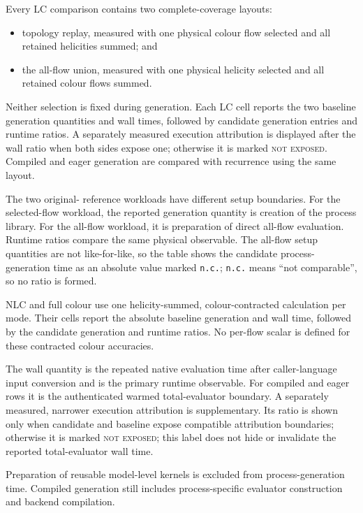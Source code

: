 Every LC comparison contains two complete-coverage layouts:
\begin{itemize}
  \item topology replay, measured with one physical colour flow selected and
        all retained helicities summed; and
  \item the all-flow union, measured with one physical helicity selected and
        all retained colour flows summed.
\end{itemize}
Neither selection is fixed during generation. Each LC cell reports the two
baseline generation quantities and wall times, followed by candidate
generation entries and runtime ratios. A separately measured execution
attribution is displayed after the wall ratio when both sides expose one;
otherwise it is marked \textsc{not exposed}. Compiled and eager generation are
compared with recurrence using the same layout.

The two original-\AC{} reference workloads have different setup boundaries.
For the selected-flow workload, the reported generation quantity is creation
of the process library. For the all-flow workload, it is preparation of direct
all-flow evaluation. Runtime ratios compare the same physical observable. The
all-flow setup quantities are not like-for-like, so the table shows the
candidate process-generation time as an absolute value marked \texttt{n.c.};
\texttt{n.c.} means ``not comparable'', so no ratio is formed.

NLC and full colour use one helicity-summed, colour-contracted calculation per
mode. Their cells report the absolute baseline generation and wall time,
followed by the candidate generation and runtime ratios. No per-flow scalar is
defined for these contracted colour accuracies.

The wall quantity is the repeated native evaluation time after caller-language
input conversion and is the primary runtime observable. For compiled and eager
rows it is the authenticated warmed total-evaluator boundary. A separately
measured, narrower execution attribution is supplementary. Its ratio is shown
only when candidate and baseline expose compatible attribution boundaries;
otherwise it is marked \textsc{not exposed}; this label does not hide or
invalidate the reported total-evaluator wall time.

Preparation of reusable model-level kernels is excluded from
process-generation time. Compiled generation still includes process-specific
evaluator construction and backend compilation.

